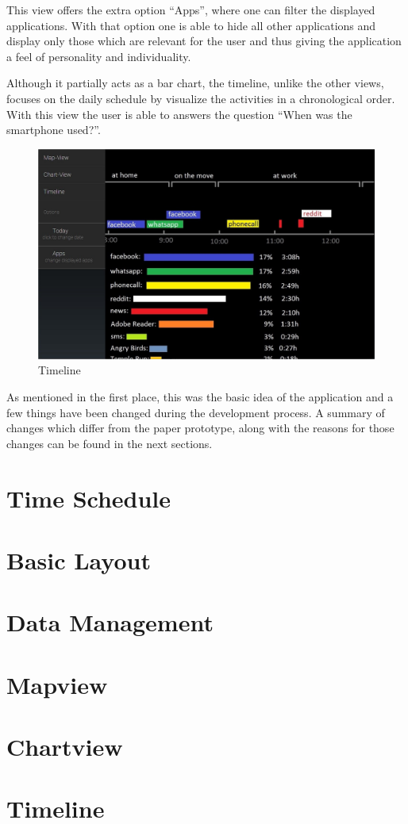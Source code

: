 This  view offers the extra option ``Apps'', where one can filter the displayed applications. With that option one is able to hide all other applications and display only those which are relevant for the user and thus giving the application a feel of personality and individuality.

Although it partially acts as a bar chart, the timeline, unlike the other views, focuses on the daily schedule by visualize the activities in a chronological order. With this view the user is able to answers the question ``When was the smartphone used?''.
\begin{figure}[h]
	\caption{Timeline}
	\includegraphics[width=\textwidth]{images/Design/3_TimeLine.jpg}
\end{figure}

As mentioned in the first place, this was the basic idea of the application and a few things have been changed during the development process. A summary of changes which differ from the paper prototype, along with the reasons for those changes can be found in the next sections.

\newpage
\section{Time Schedule}
\label{subsec:time_schedule}

\newpage
\section{Basic Layout}

\newpage
\section{Data Management}

\newpage
\section{Mapview}

\newpage
\section{Chartview}

\newpage
\section{Timeline}

